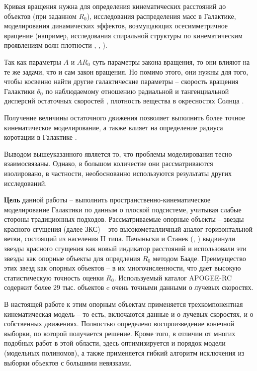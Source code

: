 \documentclass{matmex-diploma-custom}
\begin{document}
\par Кривая вращения нужна для определения кинематических расстояний до объектов (при заданном $R_0$), исследования распределения масс в Галактике, моделирования динамических эффектов, возмущающих осесимметричное вращение (например, исследования спиральной структуры по кинематическим проявлениям волн плотности \cite{20}, \cite{21}, \cite{22}).
\par Так как параметры $A$ и $AR_0$ суть параметры закона вращения, то они влияют на те же задачи, что и сам закон вращения. Но помимо этого, они нужны для того, чтобы косвенно найти другие галактические параметры -- скорость вращения Галактики $\theta_0$ по наблюдаемому отношению радиальной и тангенциальной дисперсий остаточных скоростей \cite{23}, плотность вещества в окресностях Солнца \cite{24}. 
\par Получение величины остаточного движения позволяет выполнить более точное кинематическое моделирование, а также влияет на определение радиуса коротации в Галактике \cite{25}.
\par Выводом вышеуказанного является то, что проблемы моделирования тесно взаимосвязаны. Однако, в большом количестве они рассматриваются изолировано, в частности, необоснованно используются результаты других исследований. 
\par \textbf{Цель} данной работы -- выполнить пространственно-кинематическое моделирование Галактики по данным о плоской подсистеме, учитывая слабые стороны традиционных подходов. Рассматриваемые опорные объекты -- звезды красного сгущения (далее ЗКС) -- это высокометалличный аналог горизонтальной ветви, состоящий из населения II типа. Пачыньски и Станек (\cite{26}, \cite{27}) выдвинули звезды красного сгущения как новый индикатор расстояний и использовали эти звезды как опорные объекты для опредления $R_0$ методом Бааде. Преимущество этих звезд как опорных объектов -- в их многочисленности, что дает высокую статистическую точность оценки $R_0$. Используемый каталог APOGEE-RC \cite{2} содержит более 29 тыс. объектов c очень точными данными о лучевых скоростях. 
\par В настоящей работе к этим опорным объектам применяется трехкомпонентная кинематическая модель -- то есть, включаются данные и о лучевых скоростях, и о собственных движениях. Полностью определено воспроизведение конечной выборки, по которой получается решение. Кроме того, в отличии от многих подобных работ в этой области, здесь оптимизируется и порядок модели (модельных полиномов), а также применяется гибкий алгоритм исключения из выборки объектов с большими невязками.
\end{document}
